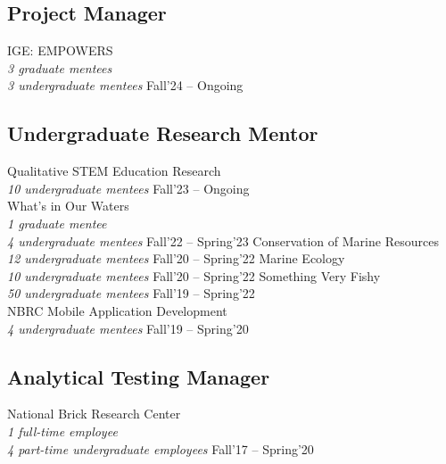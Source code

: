 
\subsection{Project Manager}
\begin{cvtable}
        {\small IGE: EMPOWERS 
        \\
        \textit{3 graduate mentees
        \\
        3 undergraduate mentees}}
        {Fall'24 -- Ongoing}
        {}
\end{cvtable}

\subsection{Undergraduate Research Mentor}
\begin{cvtable}
        {\small Qualitative STEM Education Research 
        \\
        \textit{10 undergraduate mentees}}
        {Fall'23 -- Ongoing}
        {}
    \\
        {\small What's in Our Waters 
        \\
        \textit{1 graduate mentee 
        \\ 
        4 undergraduate mentees}}
        {Fall'22 -- Spring'23}
        {}
	\cvitem{}
        {\small Conservation of Marine Resources 
        \\
        \textit{12 undergraduate mentees}}
        {Fall'20 -- Spring'22}
        {}
	\cvitem{}
        {\small Marine Ecology
        \\
        \textit{10 undergraduate mentees}}
        {Fall'20 -- Spring'22}
        {}
    \cvitem{}
        {\small Something Very Fishy 
        \\
        \textit{50 undergraduate mentees}}
        {Fall'19 -- Spring'22}
        {}
    \\
        {\small NBRC Mobile Application Development 
        \\
        \textit{4 undergraduate mentees}}
        {Fall'19 -- Spring'20}
        {}
\end{cvtable}

\subsection{Analytical Testing Manager}
\begin{cvtable}
        {\small National Brick Research Center 
        \\
        \textit{1 full-time employee
        \\
        4 part-time undergraduate employees}}
        {Fall'17 -- Spring'20}
        {}
\end{cvtable}